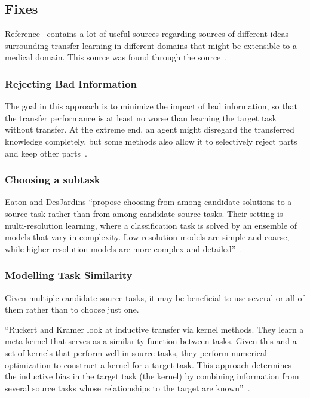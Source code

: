 \documentclass[11pt]{article}
\begin{document}
\subsection{Fixes}

Reference~\cite{torrey-handbook} contains a lot of useful sources regarding sources of different ideas surrounding transfer learning in different domains that might be extensible to a medical domain. This source was found through the source~\cite{ gentle-introduction-to-transfer-learning}.

\subsubsection{Rejecting Bad Information}

The goal in this approach is to minimize the impact of bad information, so that the transfer performance is at least no worse than learning the target task without transfer. At the extreme end, an agent might disregard the transferred knowledge completely, but some methods also allow it to selectively reject parts and keep other parts~\cite{torrey-handbook}.

\subsubsection{Choosing a subtask}

Eaton and DesJardins ``propose choosing from among candidate solutions to a source task rather than from among candidate source tasks. Their setting is multi-resolution learning, where a classification task is solved by an ensemble of models that vary in complexity. Low-resolution models are simple and coarse, while higher-resolution models are more complex and detailed''~\cite{torrey-handbook}.

\subsubsection{Modelling Task Similarity}

Given multiple candidate source tasks, it may be beneficial to use several or all of them rather than to choose just one.

``Ruckert and Kramer look at inductive transfer via kernel methods. They learn a meta-kernel that serves as a similarity function between tasks. Given this and a set of kernels that perform well in source tasks, they perform numerical optimization to construct a kernel for a target task. This approach determines the inductive bias in the target task (the kernel) by combining information from several source tasks whose relationships to the target are known''~\cite{torrey-handbook}.
\end{document}
